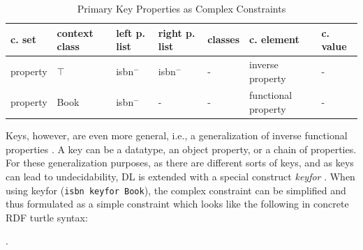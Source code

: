 \documentclass[a4paper,fontsize=11pt]{scrartcl}
\newcommand{\ms}[1]{\texttt{#1}}
\begin{document}
\begin{table}[H]
  \scriptsize
  \sffamily
  \vspace{0cm}
	\caption{Primary Key Properties as Complex Constraints}
	\label{tab:primary-key-properties-as-complex-constraints}
	\centering
		\begin{tabular}{l|l|l|l|l|l|l}
      \textbf{c. set} & \textbf{context class} & \textbf{left p. list} & \textbf{right p. list} & \textbf{classes} & \textbf{c. element} & \textbf{c. value} \\
      \hline
property & $\top$ & isbn$^{-}$ & isbn$^{-}$ & - & inverse property & - \\
property & Book & isbn$^{-}$ & - & - & functional property & - \\
		\end{tabular}
\end{table}

Keys, however, are even more general, i.e., a generalization of inverse functional properties \cite{Schneider2009}.
A key can be a datatype, an object property, or a chain of properties.
For these generalization purposes, as there are different sorts of keys, and as keys can lead to undecidability, 
DL is extended with a special construct \emph{keyfor} \cite{Lutz2005}.
When using keyfor (\ms{isbn keyfor Book}), 
the complex constraint can be simplified and thus formulated as a simple constraint which looks like the following in concrete RDF turtle syntax:



\begin{ex} .
\end{ex}
\end{document}
